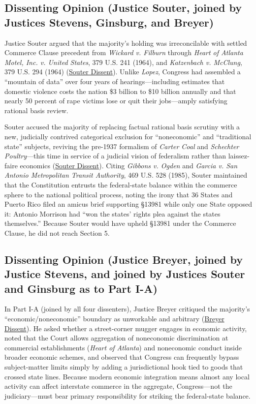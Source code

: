 \documentclass[12pt]{article}
\begin{document}
\subsection{Dissenting Opinion (Justice Souter, joined by Justices Stevens, Ginsburg, and Breyer)}
Justice Souter argued that the majority's holding was irreconcilable with settled Commerce Clause precedent from \textit{Wickard v. Filburn} through \textit{Heart of Atlanta Motel, Inc. v. United States}, 379 U.S. 241 (1964), and \textit{Katzenbach v. McClung}, 379 U.S. 294 (1964) (\href{https://www.law.cornell.edu/supct/html/99-5.ZD.html}{Souter Dissent}). Unlike \textit{Lopez}, Congress had assembled a ``mountain of data'' over four years of hearings---including estimates that domestic violence costs the nation \$3 billion to \$10 billion annually and that nearly 50 percent of rape victims lose or quit their jobs---amply satisfying rational basis review.

Souter accused the majority of replacing factual rational basis scrutiny with a new, judicially contrived categorical exclusion for ``noneconomic'' and ``traditional state'' subjects, reviving the pre-1937 formalism of \textit{Carter Coal} and \textit{Schechter Poultry}---this time in service of a judicial vision of federalism rather than laissez-faire economics (\href{https://www.law.cornell.edu/supct/html/99-5.ZD.html}{Souter Dissent}). Citing \textit{Gibbons v. Ogden} and \textit{Garcia v. San Antonio Metropolitan Transit Authority}, 469 U.S. 528 (1985), Souter maintained that the Constitution entrusts the federal-state balance within the commerce sphere to the national political process, noting the irony that 36 States and Puerto Rico filed an amicus brief supporting \S 13981 while only one State opposed it: Antonio Morrison had ``won the states' rights plea against the states themselves.'' Because Souter would have upheld \S 13981 under the Commerce Clause, he did not reach Section 5.

\subsection{Dissenting Opinion (Justice Breyer, joined by Justice Stevens, and joined by Justices Souter and Ginsburg as to Part I-A)}
In Part I-A (joined by all four dissenters), Justice Breyer critiqued the majority's ``economic/noneconomic'' boundary as unworkable and arbitrary (\href{https://www.law.cornell.edu/supct/html/99-5.ZD1.html}{Breyer Dissent}). He asked whether a street-corner mugger engages in economic activity, noted that the Court allows aggregation of noneconomic discrimination at commercial establishments (\textit{Heart of Atlanta}) and noneconomic conduct inside broader economic schemes, and observed that Congress can frequently bypass subject-matter limits simply by adding a jurisdictional hook tied to goods that crossed state lines. Because modern economic integration means almost any local activity can affect interstate commerce in the aggregate, Congress---not the judiciary---must bear primary responsibility for striking the federal-state balance.
\end{document}
